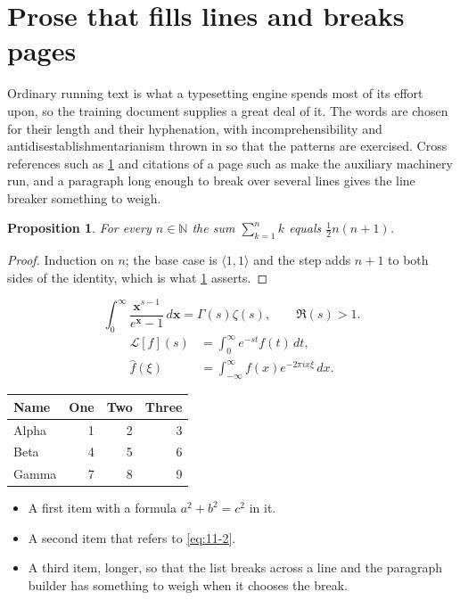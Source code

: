 \documentclass[11pt,a4paper]{report}
\theoremstyle{plain}
\newtheorem{proposition}{Proposition}[chapter]
\newcommand{\vecn}[1]{\mathbf{#1}}
\newcommand{\pairs}[2]{\langle #1,#2\rangle}
\begin{document}
\section{Prose that fills lines and breaks pages}
\label{sec:prose11-2}
Ordinary running text is what a typesetting engine spends most of its effort
upon, so the training document supplies a great deal of it. The words are
chosen for their length and their hyphenation, with incomprehensibility and
antidisestablishmentarianism thrown in so that the patterns are exercised.
Cross references such as \cref{sec:prose11-2} and citations of a page such
as \pageref{sec:prose11-2} make the auxiliary machinery run, and a
paragraph long enough to break over several lines gives the line breaker
something to weigh.
\begin{proposition}\label{prop:11-2}
For every $n\in\mathbb{N}$ the sum $\sum_{k=1}^{n}k$ equals
$\tfrac{1}{2}n(n+1)$.
\end{proposition}
\begin{proof}
Induction on $n$; the base case is $\pairs{1}{1}$ and the step adds $n+1$ to
both sides of the identity, which is what \cref{prop:11-2} asserts.
\end{proof}
\begin{equation}\label{eq:11-2}
  \int_{0}^{\infty}\frac{\vecn{x}^{s-1}}{e^{\vecn{x}}-1}\,d\vecn{x}
    = \Gamma(s)\zeta(s),\qquad \Re(s)>1 .
\end{equation}
\begin{align}
  \mathcal{L}[f](s) &= \int_{0}^{\infty} e^{-st} f(t)\,dt, \\
  \widehat{f}(\xi)  &= \int_{-\infty}^{\infty} f(x) e^{-2\pi i x\xi}\,dx .
\end{align}
\par\noindent\begin{center}
\begin{tabular}{lrrr}
\hline
Name & One & Two & Three \\
\hline
Alpha & 1 & 2 & 3 \\
Beta & 4 & 5 & 6 \\
Gamma & 7 & 8 & 9 \\
\hline
\end{tabular}
\end{center}
\begin{itemize}
  \item A first item with a formula $a^2+b^2=c^2$ in it.
  \item A second item that refers to \eqref{eq:11-2}.
  \item A third item, longer, so that the list breaks across a line and the
    paragraph builder has something to weigh when it chooses the break.
\end{itemize}
\end{document}
